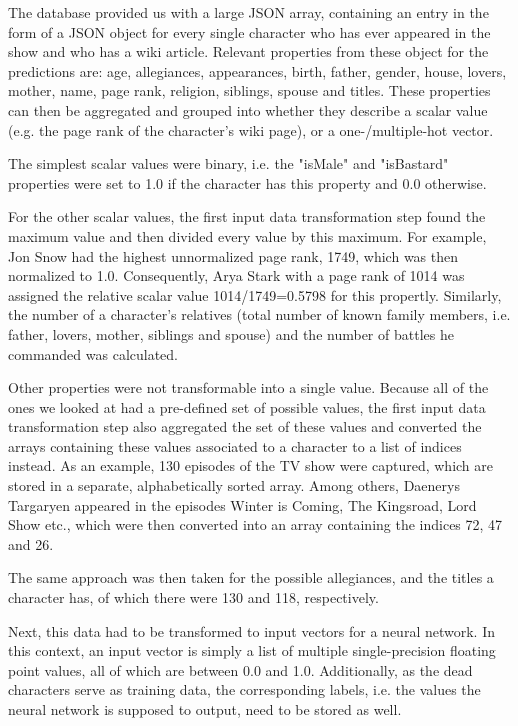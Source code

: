 \documentclass{bioinfo}
\begin{document}
The database provided us with a large JSON array, containing an entry in the form of a JSON object for every single character who has ever appeared in the show and who has a wiki article. Relevant properties from these object for the predictions are: age, allegiances, appearances, birth, father, gender, house, lovers, mother, name, page rank, religion, siblings, spouse and titles. These properties can then be aggregated and grouped into whether they describe a scalar value (e.g. the page rank of the character's wiki page), or a one-/multiple-hot vector.

The simplest scalar values were binary, i.e. the "isMale" and "isBastard" properties were set to 1.0 if the character has this property and 0.0 otherwise.

For the other scalar values, the first input data transformation step found the maximum value and then divided every value by this maximum. For example, Jon Snow had the highest unnormalized page rank, 1749, which was then normalized to 1.0. Consequently, Arya Stark with a page rank of 1014 was assigned the relative scalar value 1014/1749=0.5798 for this propertly. Similarly, the number of a character's relatives (total number of known family members, i.e. father, lovers, mother, siblings and spouse) and the number of battles he commanded was calculated.

Other properties were not transformable into a single value. Because all of the ones we looked at had a pre-defined set of possible values, the first input data transformation step also aggregated the set of these values and converted the arrays containing these values associated to a character to a list of indices instead. As an example, 130 episodes of the TV show were captured, which are stored in a separate, alphabetically sorted array. Among others, Daenerys Targaryen appeared in the episodes Winter is Coming, The Kingsroad, Lord Show etc., which were then converted into an array containing the indices 72, 47 and 26.

The same approach was then taken for the possible allegiances, and the titles a character has, of which there were 130 and 118, respectively.

Next, this data had to be transformed to input vectors for a neural network. In this context, an input vector is simply a list of multiple single-precision floating point values, all of which are between 0.0 and 1.0. Additionally, as the dead characters serve as training data, the corresponding labels, i.e. the values the neural network is supposed to output, need to be stored as well.
\end{document}

